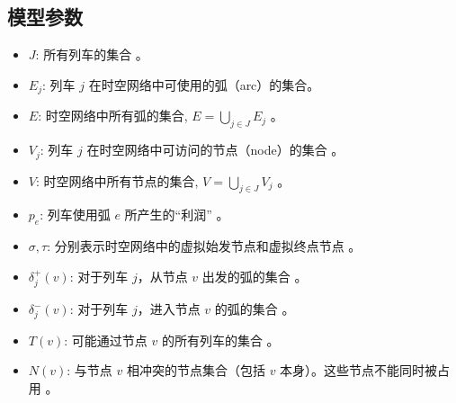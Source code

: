 \documentclass{article}
\begin{document}
    \subsection*{模型参数}
    \begin{itemize}
        \item $J$: 所有列车的集合 。
        \item $E_j$: 列车 $j$ 在时空网络中可使用的弧（arc）的集合。
        \item $E$: 时空网络中所有弧的集合, $E = \bigcup_{j \in J} E_j$ 。
        \item $V_j$: 列车 $j$ 在时空网络中可访问的节点（node）的集合 。
        \item $V$: 时空网络中所有节点的集合, $V = \bigcup_{j \in J} V_j$ 。
        \item $p_e$: 列车使用弧 $e$ 所产生的“利润” 。
        \item $\sigma, \tau$: 分别表示时空网络中的虚拟始发节点和虚拟终点节点 。
        \item $\delta_j^+(v)$: 对于列车 $j$，从节点 $v$ 出发的弧的集合 。
        \item $\delta_j^-(v)$: 对于列车 $j$，进入节点 $v$ 的弧的集合 。
        \item $T(v)$: 可能通过节点 $v$ 的所有列车的集合 。
        \item $N(v)$: 与节点 $v$ 相冲突的节点集合（包括 $v$ 本身）。这些节点不能同时被占用 。
    \end{itemize}
\end{document}
